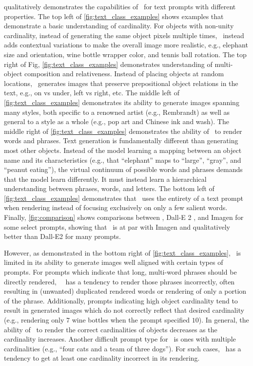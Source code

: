  qualitatively demonstrates the capabilities of \name~for text prompts with different properties. The top left of \cref{fig:text_class_examples} shows examples that demonstrate a basic understanding of cardinality. For objects with non-unity cardinality, instead of generating the same object pixels multiple times, \name~instead adds contextual variations to make the overall image more realistic, e.g., elephant size and orientation, wine bottle wrapper color, and tennis ball rotation. The top right of Fig, \ref{fig:text_class_examples} demonstrates understanding of multi-object composition and relativeness. Instead of placing objects at random locations, \name~generates images that preserve prepositional object relations in the text, e.g., on vs under, left vs right, etc. The middle left of \cref{fig:text_class_examples} demonstrates its ability to generate images spanning many styles, both specific to a renowned artist (e.g., Rembrandt) as well as general to a style as a whole (e.g., pop art and Chinese ink and wash). The middle right of \cref{fig:text_class_examples} demonstrates the ability of \name~to render words and phrases. Text generation is fundamentally different than generating most other objects. Instead of the model learning a mapping between an object name and its characteristics (e.g., that ``elephant'' maps to ``large'', ``gray'', and ``peanut eating''), the virtual continuum of possible words and phrases demands that the model learn differently. It must instead learn a hierarchical understanding between phrases, words, and letters. The bottom left of \cref{fig:text_class_examples} demonstrates that \name~uses the entirety of a text prompt when rendering instead of focusing exclusively on only a few salient words. Finally, \cref{fig:comparison} shows comparisons between \name, Dall-E 2 \citep{dalle2}, and Imagen \citep{imagen} for some select prompts, showing that \name~is at par with Imagen and qualitatively better than Dall-E2 for many prompts.

However, as demonstrated in the bottom right of \cref{fig:text_class_examples}, \name~is limited in its ability to generate images well aligned with certain types of prompts. For prompts which indicate that long, multi-word phrases should be directly rendered, ~\name~has a tendency to render those phrases incorrectly, often resulting in (unwanted) duplicated rendered words or rendering of only a portion of the phrase. Additionally, prompts indicating high object cardinality tend to result in generated images which do not correctly reflect that desired cardinality (e.g., rendering only $7$ wine bottles when the prompt specified $10$). In general, the ability of \name~to render the correct cardinalities of objects decreases as the cardinality increases. Another difficult prompt type for \name~is ones with multiple cardinalities (e.g., ``four cats and a team of three dogs''). For such cases, \name~has a tendency to get at least one cardinality incorrect in its rendering.

